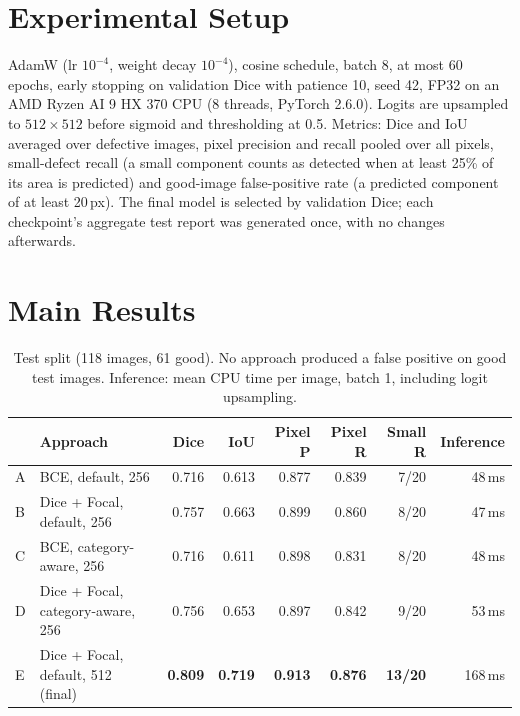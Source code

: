 \documentclass[10pt,a4paper]{article}
\begin{document}
\section{Experimental Setup}

AdamW (lr $10^{-4}$, weight decay $10^{-4}$), cosine schedule, batch 8, at most 60 epochs, early stopping on validation Dice with patience 10, seed 42, FP32 on an AMD Ryzen AI 9 HX 370 CPU (8 threads, PyTorch 2.6.0). Logits are upsampled to $512\times512$ before sigmoid and thresholding at 0.5. Metrics: Dice and IoU averaged over defective images, pixel precision and recall pooled over all pixels, small-defect recall (a small component counts as detected when at least 25\% of its area is predicted) and good-image false-positive rate (a predicted component of at least 20\,px). The final model is selected by validation Dice; each checkpoint's aggregate test report was generated once, with no changes afterwards.

\section{Main Results}

\begin{table}[H]
\centering
\small
\begin{tabular}{llrrrrrr}
\toprule
 & Approach & Dice & IoU & Pixel P & Pixel R & Small R & Inference \\
\midrule
A & BCE, default, 256 & 0.716 & 0.613 & 0.877 & 0.839 & 7/20 & 48\,ms \\
B & Dice + Focal, default, 256 & 0.757 & 0.663 & 0.899 & 0.860 & 8/20 & 47\,ms \\
C & BCE, category-aware, 256 & 0.716 & 0.611 & 0.898 & 0.831 & 8/20 & 48\,ms \\
D & Dice + Focal, category-aware, 256 & 0.756 & 0.653 & 0.897 & 0.842 & 9/20 & 53\,ms \\
E & Dice + Focal, default, 512 (final) & \textbf{0.809} & \textbf{0.719} & \textbf{0.913} & \textbf{0.876} & \textbf{13/20} & 168\,ms \\
\bottomrule
\end{tabular}
\caption{Test split (118 images, 61 good). No approach produced a false positive on good test images. Inference: mean CPU time per image, batch 1, including logit upsampling.}
\label{tab:results}
\end{table}
\end{document}
